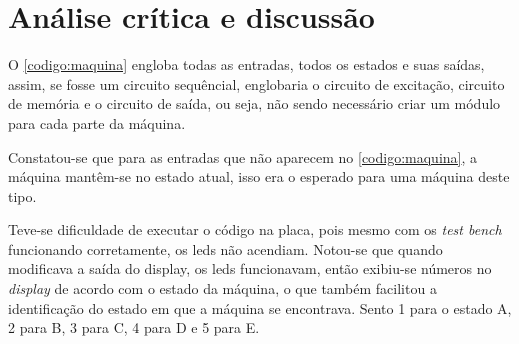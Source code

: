\chapter{Análise crítica e discussão}
	O \autoref{codigo:maquina} engloba todas as entradas, todos os estados e suas
	saídas, assim, se fosse um circuito sequêncial, englobaria o circuito de
	excitação, circuito de memória e o circuito de saída, ou seja, não sendo necessário
	criar um módulo para cada parte da máquina.

	Constatou-se que para as entradas que não aparecem no \autoref{codigo:maquina},
	a máquina mantêm-se no estado atual, isso era o esperado para uma máquina deste tipo.

	Teve-se dificuldade de executar o código na placa, pois mesmo com os \textit{test bench}
	funcionando corretamente, os \ac{led}s não acendiam. Notou-se que quando modificava a saída
	do display, os \ac{led}s funcionavam, então exibiu-se números no \textit{display} de acordo
	com o estado da máquina, o que também facilitou a identificação do estado em que a máquina
	se encontrava. Sento 1 para o estado A, 2 para B, 3 para C, 4 para D e 5 para E.

